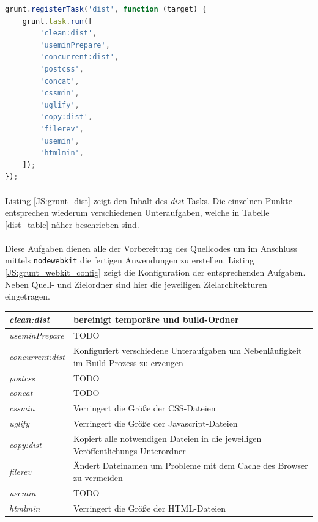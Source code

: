 \newpage
\begin{lstlisting}[language=JavaScript,label=JS:grunt_dist,caption=grunt dist-Task]
grunt.registerTask('dist', function (target) {
	grunt.task.run([
		'clean:dist',
		'useminPrepare',
		'concurrent:dist',
		'postcss',
		'concat',
		'cssmin',
		'uglify',
		'copy:dist',
		'filerev',
		'usemin',
		'htmlmin',
	]);
});
\end{lstlisting}

\paragraph{}
Listing \ref{JS:grunt_dist} zeigt den Inhalt des \textit{dist}-Tasks.
Die einzelnen Punkte entsprechen wiederum verschiedenen Unteraufgaben, welche in Tabelle \ref{dist_table} näher beschrieben sind.

\paragraph{}
Diese Aufgaben dienen alle der Vorbereitung des Quellcodes um im Anschluss mittels \texttt{nodewebkit} die fertigen Anwendungen zu erstellen.
Listing \ref{JS:grunt_webkit_config} zeigt die Konfiguration der entsprechenden Aufgaben.
Neben Quell- und Zielordner sind hier die jeweiligen Zielarchitekturen eingetragen.

\begin{tabularx}{0.92\textwidth}{lX}
	\textit{clean:dist} & bereinigt temporäre und build-Ordner\\ \hline
	\textit{useminPrepare} & TODO\\ \hline
	\textit{concurrent:dist} & Konfiguriert verschiedene Unteraufgaben um Nebenläufigkeit im Build-Prozess zu erzeugen\\ \hline
	\textit{postcss} & TODO\\ \hline
	\textit{concat} & TODO\\ \hline
	\textit{cssmin} & Verringert die Größe der CSS-Dateien\\ \hline
	\textit{uglify} & Verringert die Größe der Javascript-Dateien\\ \hline
	\textit{copy:dist} & Kopiert alle notwendigen Dateien in die jeweiligen Veröffentlichungs-Unterordner\\ \hline
	\textit{filerev} & Ändert Dateinamen um Probleme mit dem Cache des Browser zu vermeiden\\ \hline
	\textit{usemin} &  TODO\\ \hline
	\textit{htmlmin} & Verringert die Größe der HTML-Dateien\\ \hline
\end{tabularx}
\label{dist_table}
\vspace*{1cm}

